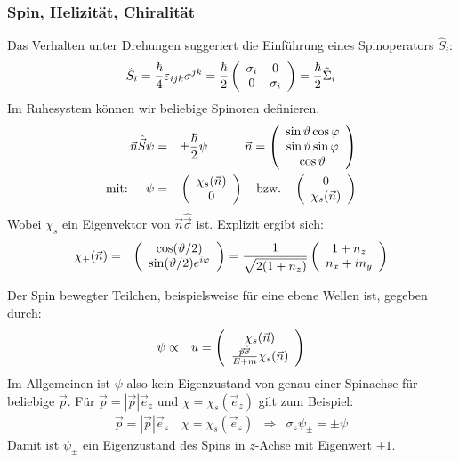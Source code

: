 \subsubsection{Spin, Helizität, Chiralität}
Das Verhalten unter Drehungen suggeriert die Einführung eines Spinoperators $\hat S_i$: 
\begin{eqnarray*}
\hat S_i = \frac \hbar 4 \varepsilon_{ijk}\sigma^{j k} = \frac \hbar 2 \left(\begin{array}{cc}\sigma_i & 0\\0 &\sigma_i\end{array}\right)=\frac \hbar 2 \widehat\Sigma_i
\end{eqnarray*}
Im Ruhesystem können wir beliebige Spinoren definieren. 
\begin{eqnarray*}
\vec n\hat{\vec{S}}\psi \g \pm \frac \hbar 2 \psi\qquad\quad\vec n = \left(\begin{array}{c}\sin\vartheta\cos\varphi\\\sin\vartheta\sin\varphi\\ \cos\vartheta\end{array}\ri)
\\
\text{mit: }\quad \psi \g \left(\begin{array}c\chi_s(\vec n)\\0\end{array}\ri) \quad\text{bzw.}\quad \left(\begin{array}c 0\\\chi_s(\vec n)\end{array}\ri)
\end{eqnarray*}
Wobei $\chi_s$ ein Eigenvektor von $\vec n\hat{\vec \sigma}$ ist. Explizit ergibt sich:
\begin{eqnarray*}
\chi_{+}(\vec n) \g \left(\begin{array}c \cos(\vartheta/2)\\ \sin(\vartheta/2) e^{i\varphi}\end{array}\ri) = \frac 1 {\sqrt{2(1+n_z)}}\left( \begin{array}c 1 + n_z \\n_x + in_y\end{array}\ri)
\end{eqnarray*}

Der Spin bewegter Teilchen, beispielsweise für eine ebene Wellen ist, gegeben durch: 
\begin{eqnarray*}
\psi &\propto& u = \left(\begin{array}c \chi_s(\vec{n}) \\ \frac{\vec p\hat{\vec  \sigma}}{E+m}\chi_s(\vec{n})\end{array}\ri)
\end{eqnarray*}
Im Allgemeinen ist $\psi$ also kein Eigenzustand von genau einer Spinachse für beliebige $\vec{p}$. Für $\vec p = |\vec{p}| \vec{e}_z$ und $\chi = \chi_{s}(\vec e_z)$ gilt zum Beispiel: 
\begin{eqnarray*}
\vec p = |\vec{p}| \vec{e}_z \quad \chi = \chi_{s}(\vec e_z) &\Rightarrow& \sigma_z \psi_\pm = \pm \psi 
\end{eqnarray*}
Damit ist $\psi_{\pm}$ ein Eigenzustand des Spins in $z$-Achse mit Eigenwert $\pm1$. 

